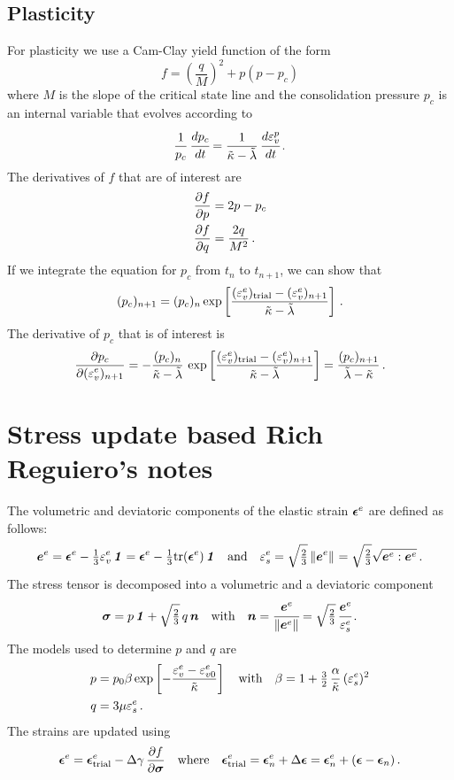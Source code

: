 \subsection{Plasticity}
For plasticity we use a Cam-Clay yield function of the form
\[
   f = \left(\frac{q}{M}\right)^2 + p(p-p_c) 
\]
where $M$ is the slope of the critical state line and the consolidation pressure $p_c$ is an internal variable that 
evolves according to 
\[
   \frac{1}{p_c}\,\cfrac{dp_c}{dt} = \frac{1}{\tilde{\kappa} - \tilde{\lambda}}\,\cfrac{d\varepsilon^p_v}{dt} \,.
\]
The derivatives of $f$ that are of interest are
\[
   \begin{aligned}
     \frac{\displaystyle\partial f}{\displaystyle\partial p} & = 2p - p_c \\
     \frac{\displaystyle\partial f}{\displaystyle\partial q} & = \frac{2q}{M^2} \,.
   \end{aligned}
\]
If we integrate the equation for $p_c$ from $t_{n}$ to $t_{n+1}$, we can show that
\[
   (p_c)_{n+1} = (p_c)_n \exp\left[\frac{(\varepsilon_v^e)_{\text{trial}} - (\varepsilon_v^e)_{n+1}}{\tilde{\kappa} - \tilde{\lambda}}\right] \,.
\]
The derivative of $p_c$ that is of interest is
\[
   \frac{\displaystyle\partial p_c}{\displaystyle\partial (\varepsilon_v^e)_{n+1}} = -\frac{(p_c)_n}{\tilde{\kappa} - \tilde{\lambda}}\,\exp\left[\frac{(\varepsilon^e_v)_{\text{trial}} - (\varepsilon_v^e)_{n+1}}{\tilde{\kappa} - \tilde{\lambda}}\right] = \frac{(p_c)_{n+1}}{\tilde{\lambda}-\tilde{\kappa}} \,.
\]

\section{Stress update based Rich Reguiero's notes}
The volumetric and deviatoric components of the elastic strain $\boldsymbol{\epsilon}^e$ are defined
as follows:
\[
   \boldsymbol{e}^e = \boldsymbol{\epsilon}^e - \tfrac{1}{3}\varepsilon^e_v\,\boldsymbol{\mathit{1}} = \boldsymbol{\epsilon}^e - \tfrac{1}{3}\text{tr}(\boldsymbol{\epsilon}^e)\,\boldsymbol{\mathit{1}}
   \quad \text{and} \quad
   \varepsilon^e_s = \sqrt{\tfrac{2}{3}}\left\lVert\boldsymbol{e}^e\right\rVert_{}  = \sqrt{\tfrac{2}{3}}\sqrt{\boldsymbol{e}^e:\boldsymbol{e}^e} \,.
\]
The stress tensor is decomposed into a volumetric and a deviatoric component
\[
   \boldsymbol{\sigma} = p\,\boldsymbol{\mathit{1}} + \sqrt{\tfrac{2}{3}}\, q\, \boldsymbol{n} \quad \text{with} \quad
   \boldsymbol{n} = \cfrac{\boldsymbol{e}^e}{\left\lVert\boldsymbol{e}^e\right\rVert_{}} = \sqrt{\tfrac{2}{3}}\, \cfrac{\boldsymbol{e}^e}{\varepsilon^e_s} \,.
\]
The models used to determine $p$ and $q$ are
\[
  \begin{aligned}
    p &= p_0\beta\exp\left[-\frac{\varepsilon^e_v - \varepsilon^e_{v0}}{\tilde{\kappa}}\right] \quad \text{with} \quad
     \beta = 1 + \tfrac{3}{2}\,\frac{\alpha}{\tilde{\kappa}}\,(\varepsilon^e_s)^2 \\
    q &= 3\mu\varepsilon^e_s \,.
  \end{aligned}
\]
The strains are updated using
\[
  \boldsymbol{\epsilon}^e = \boldsymbol{\epsilon}^e_{\rm trial} - \Delta\gamma\,\frac{\displaystyle\partial f}{\displaystyle\partial \boldsymbol{\sigma}}
  \quad \text{where} \quad \boldsymbol{\epsilon}^e_{\rm trial} = \boldsymbol{\epsilon}^e_n + \Delta\boldsymbol{\epsilon}
     = \boldsymbol{\epsilon}^e_n + (\boldsymbol{\epsilon} - \boldsymbol{\epsilon}_n) \,.
\]

